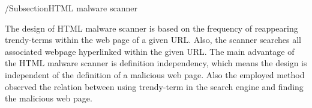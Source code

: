 /Subsection{HTML malware scanner}

The design of HTML malware scanner is based on the frequency of reappearing trendy-terms within the web page of a given URL. Also, the scanner searches all associated webpage hyperlinked within the given URL. The main advantage of the HTML malware scanner is definition independency, which means the design is independent of the definition of a malicious web page. Also the employed method observed the relation between using trendy-term in the search engine and finding the malicious web page.
